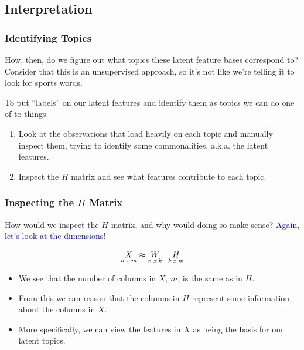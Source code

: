 \documentclass{beamer}
\begin{document}
\subsection{Interpretation}
\begin{frame}
  \frametitle{Identifying Topics}
  How, then, do we figure out what topics these latent feature bases correspond to? Consider that this is an unsupervised approach, so it's not like we're telling it to look for sports words. \vspace{0.5mm}

  To put ``labels'' on our latent features and identify them as topics we can do one of to things. \vspace{2mm} \pause

  \begin{enumerate}
    \item Look at the observations that load heavily on each topic and manually inspect them, trying to identify some commonalities, a.k.a. the latent features. \vspace{2mm} \pause
    \item Inspect the $H$ matrix and see what features contribute to each topic.
  \end{enumerate} \vspace{2mm} \pause
\end{frame}

\begin{frame}
  \frametitle{Inspecting the $H$ Matrix}

  How would we inspect the $H$ matrix, and why would doing so make sense? \pause \textcolor{blue}{Again, let's look at the dimensions!}

  {\large $$ \underset{\small n\: x \: m}{X} \approx \underset{\small n\: x \: k}{W} \cdot \underset{\small k\: x \: m}{H} $$} \vspace{-3mm}

  \begin{itemize}
    \item We see that the number of columns in $X$, $m$, is the same as in $H$.
    \item From this we can reason that the columns in $H$ represent some information about the columns in $X$.
    \item More specifically, we can view the features in $X$ as being the basis for our latent topics.
  \end{itemize}
\end{frame}
\end{document}
